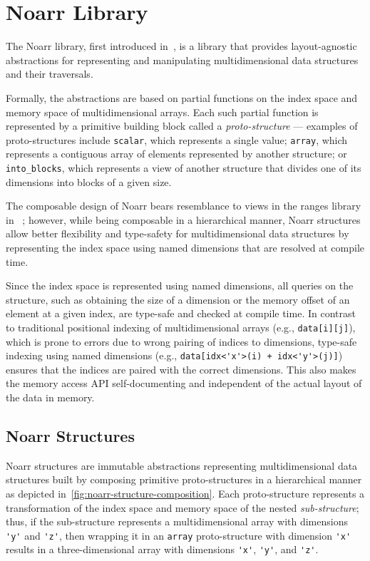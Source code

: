 \section{Noarr Library}\label{chap:noarr}

The Noarr library, first introduced in~\cite{vsmelko2022astute}, is a \cpp library that provides layout-agnostic abstractions for representing and manipulating multidimensional data structures and their traversals.

Formally, the abstractions are based on partial functions on the index space and memory space of multidimensional arrays. Each such partial function is represented by a primitive building block called a \emph{proto-structure} --- examples of proto-structures include \lstinline{scalar}, which represents a single value; \lstinline{array}, which represents a contiguous array of elements represented by another structure; or \lstinline{into_blocks}, which represents a view of another structure that divides one of its dimensions into blocks of a given size.

The composable design of Noarr bears resemblance to views in the ranges library in \cpptwenty~\cite{niebler2018one}; however, while being composable in a hierarchical manner, Noarr structures allow better flexibility and type-safety for multidimensional data structures by representing the index space using named dimensions that are resolved at compile time.

Since the index space is represented using named dimensions, all queries on the structure, such as obtaining the size of a dimension or the memory offset of an element at a given index, are type-safe and checked at compile time. In contrast to traditional positional indexing of multidimensional arrays (e.g., \lstinline{data[i][j]}), which is prone to errors due to wrong pairing of indices to dimensions, type-safe indexing using named dimensions (e.g., \lstinline{data[idx<'x'>(i) + idx<'y'>(j)]}) ensures that the indices are paired with the correct dimensions. This also makes the memory access API self-documenting and independent of the actual layout of the data in memory.


\subsection{Noarr Structures}\label{sec:noarr-structures}


Noarr structures are immutable abstractions representing multidimensional data structures built by composing primitive proto-structures in a hierarchical manner as depicted in~\cref{fig:noarr-structure-composition}. Each proto-structure represents a transformation of the index space and memory space of the nested \emph{sub-structure}; thus, if the sub-structure represents a multidimensional array with dimensions \lstinline{'y'} and \lstinline{'z'}, then wrapping it in an \lstinline{array} proto-structure with dimension \lstinline{'x'} results in a three-dimensional array with dimensions \lstinline{'x'}, \lstinline{'y'}, and \lstinline{'z'}.

